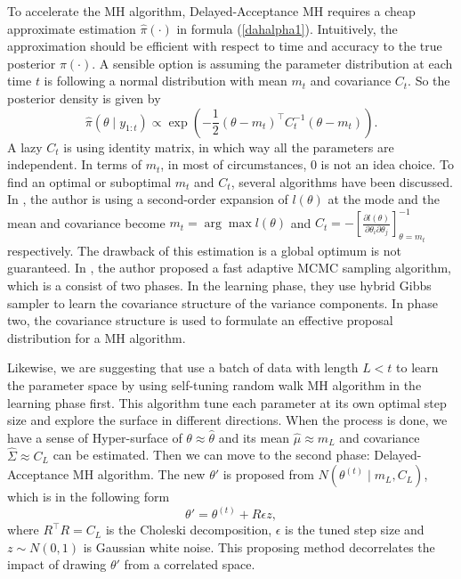 To accelerate the MH algorithm, Delayed-Acceptance MH requires a cheap approximate estimation $\hat{\pi}(\cdot)$ in formula (\ref{dahalpha1}). Intuitively, the approximation should be efficient with respect to time and accuracy to the true posterior $\pi(\cdot)$. A sensible option is assuming the parameter distribution at each time $t$ is following a normal distribution with mean $m_t$ and covariance $C_t$. So the posterior density is given by 
\begin{equation*}
\hat{\pi}(\theta\mid y_{1:t}) \propto \exp\left( -\frac{1}{2}(\theta-m_t)^\top C_t^{-1}(\theta-m_t)\right). 
\end{equation*}
A lazy $C_t$ is using identity matrix, in which way all the parameters are independent. In terms of $m_t$, in most of circumstances, 0 is not an idea choice. To find an optimal or suboptimal $m_t$ and $C_t$, several algorithms have been discussed. In \cite{stroud2016bayesian}, the author is using a second-order expansion of $l(\theta)$ at the mode and the mean and covariance become $m_t=\arg \max l(\theta)$ and $C_t = - \left[ \frac{\partial l(\theta)}{\partial \theta_i \partial \theta_j} \right]_{\theta=m_t}^{-1}$ respectively. The drawback of this estimation is a global optimum is not guaranteed. In \cite{mathew2012bayesian}, the author proposed a fast adaptive MCMC sampling algorithm, which is a consist of two phases. In the learning phase, they use hybrid Gibbs sampler to learn the covariance structure of the variance components. In phase two, the covariance structure is used to formulate an effective proposal distribution for a MH algorithm. 


Likewise, we are suggesting that use a batch of data with length $L<t$ to learn the parameter space by using self-tuning random walk MH algorithm in the learning phase first. This algorithm tune each parameter at its own optimal step size and explore the surface in different directions. When the process is done, we have a sense of Hyper-surface of $\theta\approx\hat{\theta}$ and its mean $\hat{\mu}\approx m_L$ and covariance $\hat{\Sigma}\approx C_L$ can be estimated. Then we can move to the second phase: Delayed-Acceptance MH algorithm. The new $\theta'$ is proposed from  $N(\theta^{(t)}\mid m_L,C_L)$, which is in the following form 
\begin{equation}
\theta' = \theta^{(t)} + R\epsilon z,
\end{equation}
where $R^\top R = C_L$ is the Choleski decomposition, $\epsilon$ is the tuned step size and $z\sim N(0,1)$ is Gaussian white noise. This proposing method decorrelates the impact of drawing $\theta'$ from a correlated space. 


